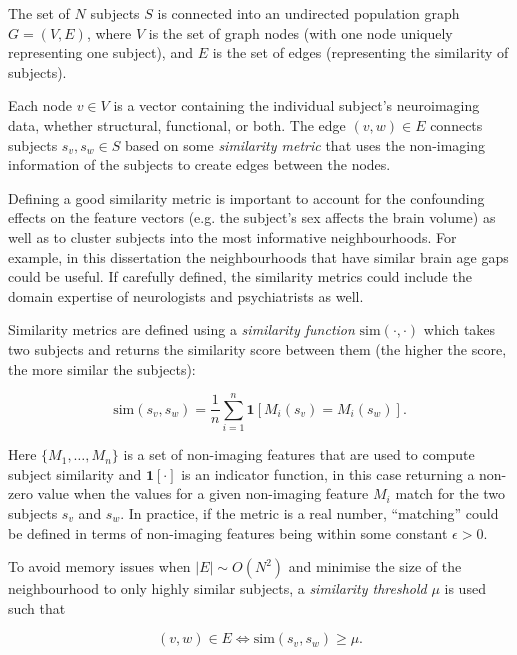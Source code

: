 The set of $N$ subjects $S$ is connected into an undirected population graph $G = (V, E)$, where $V$ is the set of graph nodes (with one node uniquely representing one subject), and $E$ is the set of edges (representing the similarity of subjects).

Each node $v \in V$ is a vector containing the individual subject's neuroimaging data, whether structural, functional, or both. The edge $(v, w) \in E$ connects subjects $s_v, s_w \in S$ based on some \textit{similarity metric} that uses the non-imaging information of the subjects to create edges between the nodes. 

Defining a good similarity metric is important to account for the confounding effects on the feature vectors (e.g. the subject's sex affects the brain volume) as well as to cluster subjects into the most informative neighbourhoods. For example, in this dissertation the neighbourhoods that have similar brain age gaps could be useful. If carefully defined, the similarity metrics could include the domain expertise of neurologists and psychiatrists as well.

Similarity metrics are defined using a \textit{similarity function} $\mathrm{sim}(\cdot, \cdot)$ which takes two subjects and returns the similarity score between them (the higher the score, the more similar the subjects):

\begin{equation}
    \mathrm{sim}(s_v, s_w) = \frac{1}{n}\sum_{i=1}^{n} \mathbf{1}[M_i(s_v) = M_i(s_w)].
    \label{eq:similarity}
\end{equation}

Here $\{M_1, \dots, M_n\}$ is a set of non-imaging features that are used to compute subject similarity and $\mathbf{1}[\cdot]$ is an indicator function, in this case returning a non-zero value when the values for a given non-imaging feature $M_i$ match for the two subjects $s_v$ and $s_w$. In practice, if the metric is a real number, ``matching'' could be defined in terms of non-imaging features being within some constant $\epsilon > 0$. 

To avoid memory issues when $|E| \sim O(N^2)$ and minimise the size of the neighbourhood to only highly similar subjects, a \textit{similarity threshold} $\mu$ is used such that

\begin{equation}
    (v, w) \in E \iff \mathrm{sim}(s_v, s_w) \geq \mu.
    \label{eq:similarity-threshold}
\end{equation}


